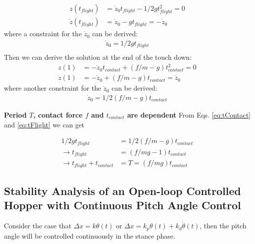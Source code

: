 \begin{align}
z(t_{flight}) &= \dot z_0t_{flight} - 1/2gt^2_{flight} = 0\\
\dot z(t_{flight}) &= \dot z_0 - gt_{flight} = -\dot z_0
\end{align}
where a constraint for the $\dot z_0$ can be derived:
\begin{align}
\label{eq:tFlight}
\dot z_0 =  1/2gt_{flight}\\
\end{align}
Then we can derive the solution at the end of the touch down:
\begin{align}
z(1) &= -\dot z_0t_{contact} + (f/m -g)t_{contact}^2 = 0 \\
\dot z(1) &= -\dot z_0 + (f/m -g)t_{contact} = \dot z_0
\end{align}
where another constraint for the $\dot z_0$ can be derived:
\begin{align}
\label{eq:tContact}
\dot z_0 =  1/2(f/m-g)t_{contact}
\end{align}

\noindent \textbf{Period $T$, contact force $f$ and $t_{contact}$ are dependent }
From Eqs. \ref{eq:tContact} and \ref{eq:tFlight} we can get

\begin{align*}
1/2gt_{flight} &=  1/2(f/m-g)t_{contact}\\
\rightarrow t_{flight} &= (f/mg -1) t_{contact}\\
\rightarrow t_{flight} + t_{contact} &= T = (f/mg)t_{contact}
\end{align*}

\pagebreak	


\subsection{Stability Analysis of an Open-loop Controlled Hopper with Continuous Pitch Angle Control}
Consider the case that $\Delta x = k\theta(t)$ or $\Delta x = k_p\theta(t) + k_d\dot\theta(t)$, then the pitch angle will be controlled continuously in the stance phase. 


